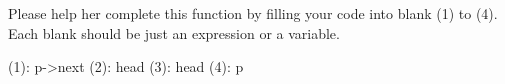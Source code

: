 \begin{parts}
    Please help her complete this function by filling your code into blank (1) to (4). Each blank should be just an expression or a variable.

    \begin{solution}
        \begin{cpp}
            (1): p->next
            (2): head
            (3): head
            (4): p
        \end{cpp}
    \end{solution}
    

    
\end{parts}
